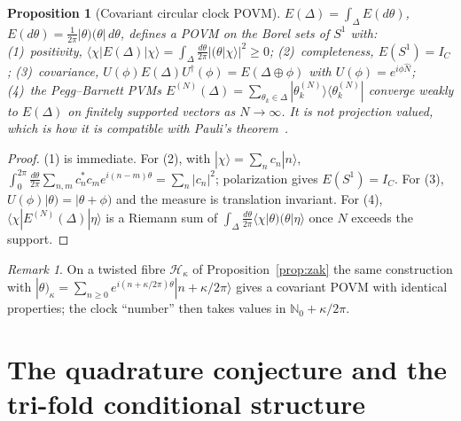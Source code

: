 \documentclass[aps,prd,onecolumn,notitlepage,10pt,amsmath,amssymb,amsfonts,nofootinbib]{revtex4-2}
\newtheorem{proposition}{Proposition}
\theoremstyle{definition}
\theoremstyle{remark}
\newtheorem{remark}{Remark}
\newcommand{\Hil}{\mathcal{H}}
\newcommand{\Nop}{\widehat{N}}
\newcommand{\N}{\mathbb{N}}
\newcommand{\pket}[1]{|#1)}
\newcommand{\pbra}[1]{(#1|}
\begin{document}
\begin{proposition}[Covariant circular clock POVM]
\label{prop:povm}
$E(\Delta)=\int_\Delta E(d\theta)$, $E(d\theta)=\frac{1}{2\pi}\pket{\theta}\pbra{\theta}\,d\theta$, defines a POVM on the Borel sets of $S^1$ with:
(1)~positivity, $\langle\chi|E(\Delta)|\chi\rangle=\int_\Delta\frac{d\theta}{2\pi}|\pbra{\theta}\chi\rangle|^2\ge0$;
(2)~completeness, $E(S^1)=I_C$;
(3)~covariance, $U(\phi)E(\Delta)U^\dagger(\phi)=E(\Delta\oplus\phi)$ with $U(\phi)=e^{i\phi\Nop}$;
(4)~the Pegg--Barnett PVMs $E^{(N)}(\Delta)=\sum_{\theta_k\in\Delta}|\theta_k^{(N)}\rangle\langle\theta_k^{(N)}|$ converge weakly to $E(\Delta)$ on finitely supported vectors as $N\to\infty$.
It is not projection valued, which is how it is compatible with Pauli's theorem~\cite{Holevo1982,BuschGrabowskiLahti1995}.
\end{proposition}

\begin{proof}
(1) is immediate. For (2), with $|\chi\rangle=\sum_nc_n|n\rangle$, $\int_0^{2\pi}\frac{d\theta}{2\pi}\sum_{n,m}c_n^*c_me^{i(n-m)\theta}=\sum_n|c_n|^2$; polarization gives $E(S^1)=I_C$. For (3), $U(\phi)\pket{\theta}=\pket{\theta+\phi}$ and the measure is translation invariant. For (4), $\langle\chi|E^{(N)}(\Delta)|\eta\rangle$ is a Riemann sum of $\int_\Delta\frac{d\theta}{2\pi}\langle\chi\pket{\theta}\pbra{\theta}\eta\rangle$ once $N$ exceeds the support.
\end{proof}

\begin{remark}
On a twisted fibre $\Hil_\kappa$ of Proposition~\ref{prop:zak} the same construction with $\pket{\theta}_\kappa=\sum_{n\ge0}e^{i(n+\kappa/2\pi)\theta}|n+\kappa/2\pi\rangle$ gives a covariant POVM with identical properties; the clock ``number'' then takes values in $\N_0+\kappa/2\pi$.
\end{remark}

\section{The quadrature conjecture and the tri-fold conditional structure}
\label{sec:quadrature}
\end{document}
